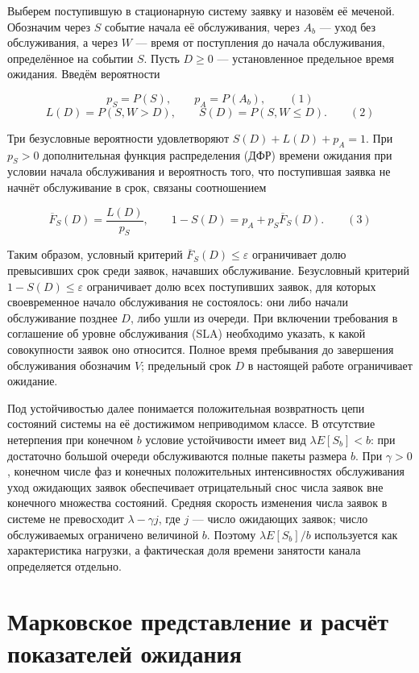 Выберем поступившую в стационарную систему заявку и назовём её меченой. Обозначим через $S$ событие начала её обслуживания, через $A_b$ --- уход без обслуживания, а через $W$ --- время от поступления до начала обслуживания, определённое на событии $S$. Пусть $D\geq0$ --- установленное предельное время ожидания. Введём вероятности

\[p_S=P(S), \qquad  p_A=P(A_b),\qquad (1)\]
\[L(D)=P(S,W>D), \qquad  S(D)=P(S,W\leq D).\qquad (2)\]

Три безусловные вероятности удовлетворяют $S(D)+L(D)+p_A=1$.
При $p_S>0$ дополнительная функция распределения (ДФР) времени ожидания при условии начала обслуживания и вероятность того, что поступившая заявка не начнёт обслуживание в срок, связаны соотношением

\[\overline F_S(D)=\frac{L(D)}{p_S},\qquad
 1-S(D)=p_A+p_S\overline F_S(D).\qquad (3)\]

Таким образом, условный критерий $\overline F_S(D)\leq\varepsilon$ ограничивает долю превысивших срок среди заявок, начавших обслуживание. Безусловный критерий $1-S(D)\leq\varepsilon$ ограничивает долю всех поступивших заявок, для которых своевременное начало обслуживания не состоялось: они либо начали обслуживание позднее $D$, либо ушли из очереди. При включении требования в соглашение об уровне обслуживания (SLA) необходимо указать, к какой совокупности заявок оно относится. Полное время пребывания до завершения обслуживания обозначим $V$; предельный срок $D$ в настоящей работе ограничивает ожидание.

Под устойчивостью далее понимается положительная возвратность цепи состояний системы на её достижимом неприводимом классе. В отсутствие нетерпения при конечном $b$ условие устойчивости имеет вид $\lambda E[S_b]<b$: при достаточно большой очереди обслуживаются полные пакеты размера $b$. При $\gamma>0$, конечном числе фаз и конечных положительных интенсивностях обслуживания уход ожидающих заявок обеспечивает отрицательный снос числа заявок вне конечного множества состояний. Средняя скорость изменения числа заявок в системе не превосходит $\lambda-\gamma j$, где $j$ --- число ожидающих заявок; число обслуживаемых ограничено величиной $b$. Поэтому $\lambda E[S_b]/b$ используется как характеристика нагрузки, а фактическая доля времени занятости канала определяется отдельно.

\section*{Марковское представление и расчёт показателей ожидания}

